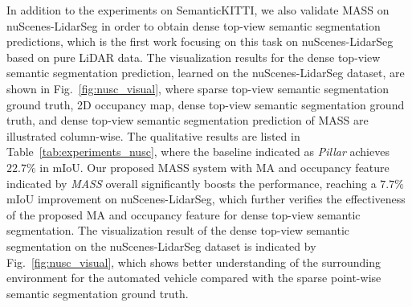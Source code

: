 \documentclass[lettersize,journal]{IEEEtran}
\begin{document}
In addition to the experiments on SemanticKITTI, we also validate MASS on nuScenes-LidarSeg in order to obtain dense top-view semantic segmentation predictions, which is the first work focusing on this task on nuScenes-LidarSeg based on pure LiDAR data. The visualization results for the dense top-view semantic segmentation prediction, learned on the nuScenes-LidarSeg dataset, are shown in Fig.~\ref{fig:nusc_visual}, where sparse top-view semantic segmentation ground truth, 2D occupancy map, dense top-view semantic segmentation ground truth, and dense top-view semantic segmentation prediction of MASS are illustrated column-wise.
The qualitative results are listed in Table~\ref{tab:experiments_nusc}, where the baseline indicated as \emph{Pillar} achieves $22.7\%$ in mIoU.
Our proposed MASS system with MA and occupancy feature indicated by \emph{MASS} overall significantly boosts the performance, reaching a $7.7\%$ mIoU improvement on nuScenes-LidarSeg, which further verifies the effectiveness of the proposed MA and occupancy feature for dense top-view semantic segmentation. The visualization result of the dense top-view semantic segmentation on the nuScenes-LidarSeg dataset is indicated by Fig.~\ref{fig:nusc_visual}, which shows better understanding of the surrounding environment for the automated vehicle compared with the sparse point-wise semantic segmentation ground truth.
\end{document}
